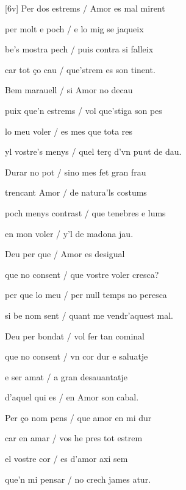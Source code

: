 \documentclass[12pt]{article}
\begin{document}
\begin{estrofa}

 [6v] Per dos estrems / Amor es mal mirent

 per molt e poch / e lo mig se jaqueix

 be's mostra pech / puis contra si falleix

 car tot \c{c}o cau / que'strem es son tinent.

 Bem marauell / si Amor no decau

 puix que'n estrems / vol que'stiga son pes

 lo meu voler / es mes que tota res

 yl vostre's menys / quel ter\c{c} d'vn pu\textit{n}t de dau.

\end{estrofa}



\begin{estrofa}

 Durar no pot / sino mes fet gran frau

 trencant Amor / de natura'ls costums

 poch menys contrast / que tenebres e lums

 en mon voler / y'l de madona jau.

 Deu per que / Amor es desigual

 que no consent / que vostre voler cresca?

 per que lo meu / per null temps no peresca

 si be nom sent / quant me vendr'aquest mal.

\end{estrofa}



\begin{estrofa}

 Deu per bondat / vol fer tan cominal

 que no consent / vn cor dur e saluatje

 e ser amat / a gran desauantatje

 d'aquel qui es / en Amor son cabal.

 Per \c{c}o nom pens / que amor en mi dur

 car en amar / vos he pres tot estrem

 el vostre cor / es d'amor axi sem

 que'n mi pensar / no crech james atur.

\end{estrofa}
\end{document}
